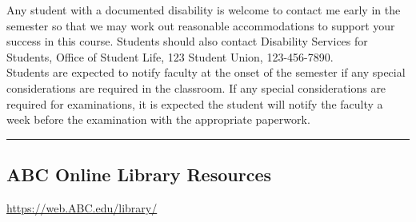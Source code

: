 Any student with a documented disability is welcome to contact me early in the semester so that we may work out reasonable accommodations to support your success in this course. Students should also contact Disability Services for Students, Office of Student Life, 123 Student Union, 123-456-7890.\\


Students are expected to notify faculty at the onset of the semester if any special considerations are required in the classroom. If any special considerations are required for examinations, it is expected the student will notify the faculty a week before the examination with the appropriate paperwork.

 \vspace{2ex}\hrule\vspace{2ex}



\subsection*{ABC Online Library Resources}
\url{https://web.ABC.edu/library/}


